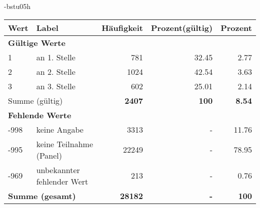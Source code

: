                 \vspace*{-\baselineskip}
					\begin{filecontents}{\jobname-bstu05h}
					\begin{longtable}{lXrrr}
					\toprule
					\textbf{Wert} & \textbf{Label} & \textbf{Häufigkeit} & \textbf{Prozent(gültig)} & \textbf{Prozent} \\
					\endhead
					\midrule
					\multicolumn{5}{l}{\textbf{Gültige Werte}}\\

					1 &
					\multicolumn{1}{X}{ an 1. Stelle   } &


					  \num{781} &
					  \num[round-mode=places,round-precision=2]{32.45} &
					    \num[round-mode=places,round-precision=2]{2.77} \\

					2 &
					\multicolumn{1}{X}{ an 2. Stelle   } &


					  \num{1024} &
					  \num[round-mode=places,round-precision=2]{42.54} &
					    \num[round-mode=places,round-precision=2]{3.63} \\

					3 &
					\multicolumn{1}{X}{ an 3. Stelle   } &


					  \num{602} &
					  \num[round-mode=places,round-precision=2]{25.01} &
					    \num[round-mode=places,round-precision=2]{2.14} \\
					\midrule
					\multicolumn{2}{l}{Summe (gültig)} &
					  \textbf{\num{2407}} &
					\textbf{\num{100}} &
					  \textbf{\num[round-mode=places,round-precision=2]{8.54}} \\
					\multicolumn{5}{l}{\textbf{Fehlende Werte}}\\
							-998 &
							keine Angabe &
							  \num{3313} &
							 - &
							  \num[round-mode=places,round-precision=2]{11.76} \\
							-995 &
							keine Teilnahme (Panel) &
							  \num{22249} &
							 - &
							  \num[round-mode=places,round-precision=2]{78.95} \\
							-969 &
							unbekannter fehlender Wert &
							  \num{213} &
							 - &
							  \num[round-mode=places,round-precision=2]{0.76} \\
					\midrule
					\multicolumn{2}{l}{\textbf{Summe (gesamt)}} &
				      \textbf{\num{28182}} &
				    \textbf{-} &
				    \textbf{\num{100}} \\
					\bottomrule
					\end{longtable}
					\end{filecontents}
